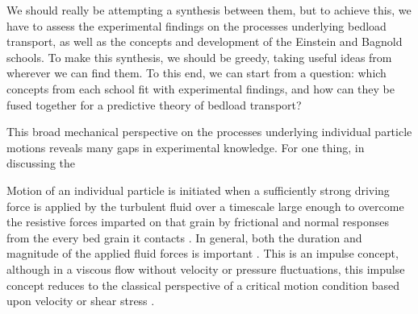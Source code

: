 \documentclass{article}
\begin{document}
We should really be attempting a synthesis between them, but to achieve this, we have to assess the experimental findings on the processes underlying bedload transport, as well as the concepts and development of the Einstein and Bagnold schools.  
To make this synthesis, we should be greedy, taking useful ideas from wherever we can find them. 
To this end, we can start from a question: which concepts from each school fit with experimental findings, and how can they be fused together for a predictive theory of bedload transport?  




This broad mechanical perspective on the processes underlying individual particle motions reveals many gaps in experimental knowledge. 
For one thing, in discussing the 






















Motion of an individual particle is initiated when a sufficiently strong driving force is applied by the turbulent fluid over a timescale large enough to overcome the resistive forces imparted on that grain by frictional and normal responses from the every bed grain it contacts \citep{Paintal1971, Valyrakis2010, Celik2014}. 
In general, both the duration and magnitude of the applied fluid forces is important \citep{Diplas2008, Valkyrus2010, Celik2014}. 
This is an impulse concept, although in a viscous flow without velocity or pressure fluctuations, this impulse concept reduces to the classical perspective of a critical motion condition based upon velocity or shear stress \citep{Shields1936, Buffington1997}. 
\end{document}
